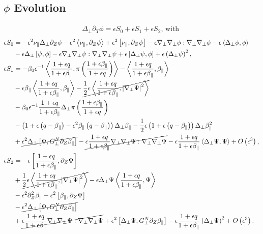 \documentclass{article}
\newcommand{\para}{\parallel}
\newcommand{\ep}{\epsilon}
\newcommand{\np}{\nabla_\perp}
\newcommand{\lap}{\Delta_\perp}
\newcommand{\p}{\partial}
\newcommand{\fr}{\frac{1+\ep q}{1+\ep\beta_\para}}
\newcommand{\frinv}{\frac{1+\ep\beta_\para}{1+\ep q}}
\newcommand{\GN}{G_\perp^N}
\newcommand{\pth} [1] {\left( #1 \right) }
\newcommand{\br} [1] {\left[ #1 \right] }
\begin{document}
\subsection{$\phi$ Evolution}
\begin{align}  
    \lap\p_T\phi = \ep S_0 + \ep S_1 + \ep S_2 \text{, with }
\end{align}
\begin{align*}
    \ep S_0 &= -\ep^2\nu_\para \lap\p_Z\phi - \ep^2\Braket{\nu_\para, \p_Z\phi} + \ep^2\br{\nu_\para, \p_Z\psi} - \ep\np\np\phi:\np\np\phi - \ep\Braket{\lap\phi, \phi} \\ 
        &- \ep\lap\br{\psi,\phi} - \ep\np\np\psi:\np\np\psi + \ep\br{\lap\psi, \phi} + \ep\pth{\lap\psi}^2, \\ 
    \ep S_1 &= -\beta_0\ep^{-1}\Braket{\fr, \pi\pth{\frinv}} - \Braket{\fr, \beta_\para} \\ 
        &- \ep\beta_\para\Braket{\fr, \beta_\para} - \cancel{\frac{1}{2}\ep \Braket{\fr, \left|\np\Psi\right|^2}} \\ 
        &- \beta_0\ep^{-1}\fr\lap\pi\pth{\frinv} \\ 
        &- \pth{1 + \ep\pth{q-\beta_\para} - \ep^2 \beta_\para \pth{q-\beta_\para}} \lap\beta_\para - \frac{1}{2}\ep \pth{1 + \ep\pth{q-\beta_\para}} \lap \beta_\para^2 \\ 
        &+ \cancel{\ep^2\lap\br{\Psi, \GN\p_Z\beta_\para}} - \cancel{\ep\fr \np\np\Psi:\np\np\Psi} - \ep\fr \Braket{\lap\Psi, \Psi} + O\pth{\ep^3}, \\ 
    \ep S_2 &= - \ep\br{\fr, \p_Z\Psi} \\ 
        &+ \cancel{\frac{1}{2}\ep\Braket{\fr, \left|\np\Psi\right|^2}} -\ep\lap\Psi \Braket{\fr, \Psi} \\ 
        &- \ep^2\p^2_Z\beta_\para - \ep^2\br{\beta_\para, \p_Z\Psi} \\ 
        &- \cancel{\ep^2\lap\br{\Psi, \GN\p_Z\beta_\para}} \\ 
        &+ \cancel{\ep\fr\np\np\Psi:\np\np\Psi} + \ep^2\br{\lap\Psi, \GN\p_Z\beta_\para} - \ep\fr\pth{\lap\Psi}^2 + O\pth{\ep^3}. 
\end{align*}
\end{document}
